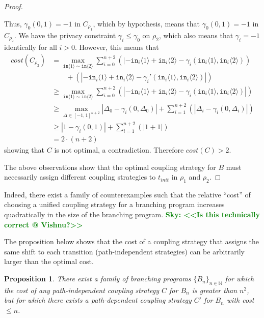 \documentclass[12pt]{article}
\newcommand{\NN}{\mathbb{N}}
\newcommand{\brangle}[1]{\langle#1 \rangle}
\newcommand{\todo}[2]{\textcolor{#1}{\textbf{#2}}}
\newcommand{\sky}[1]{\todo{green}{Sky: <<#1>>}}
\newtheorem{prop}[thm]{Proposition}
\theoremstyle{definition}
\begin{document}
\begin{proof}
\begin{itemize}
    Thus, $\gamma_0(0, 1) = -1$ in $C_{\rho_1}$, which by hypothesis, means that $\gamma_0(0, 1) = -1$ in $C_{\rho_2}$. We have the privacy constraint $\gamma_i \leq \gamma_0$ on $\rho_2$, which also means that $\gamma_i = -1$ identically for all $i > 0$. However, this means that 
    \begin{align*}
        cost(C_{\rho_2}) &= \max_{\texttt{in}\brangle{1}\sim\texttt{in}\brangle{2}}\sum_{i=0}^{n+2}(|-\texttt{in}_i\brangle{1}+\texttt{in}_i\brangle{2}-\gamma_i(\texttt{in}_i\brangle{1}, \texttt{in}_i\brangle{2}))\\&\qquad+(|-\texttt{in}_i\brangle{1}+\texttt{in}_i\brangle{2}-\gamma_i'(\texttt{in}_i\brangle{1}, \texttt{in}_i\brangle{2})|)\\
        &\geq \max_{\texttt{in}\brangle{1}\sim\texttt{in}\brangle{2}} \sum_{i=0}^{n+2}(|-\texttt{in}_i\brangle{1}+\texttt{in}_i\brangle{2}-\gamma_i(\texttt{in}_i\brangle{1}, \texttt{in}_i\brangle{2})|)\\
        &\geq \max_{\Delta \in [-1, 1]^{n+2}} |\Delta_0 - \gamma_i(0, \Delta_0)| + \sum_{i=1}^{n+2}(|\Delta_i-\gamma_i(0, \Delta_i)|)\\
        &\geq |1 - \gamma_i(0, 1)| + \sum_{i=1}^{n+2}(|1+1|)\\
        &= 2 \cdot (n + 2)
    \end{align*}
    showing that $C$ is not optimal, a contradiction. Therefore $cost(C) > 2$.

    \end{itemize}
    
    The above observations show that the optimal coupling strategy for $B$ must necessarily assign different coupling strategies to $t_{init}$ in $\rho_1$ and $\rho_2$.
\end{proof}

Indeed, there exist a family of counterexamples such that the relative ``cost'' of choosing a unified coupling strategy for a branching program increases quadratically in the size of the branching program. \sky{Is this technically correct @ Vishnu?}

The proposition below shows that the cost of a coupling strategy that assigns the same shift to each transition (path-independent strategies) can be arbitrarily larger than the optimal cost. 

\begin{prop}
    There exist a family of branching programs $\{B_n\}_{n\in \NN}$ for which the cost of any path-independent coupling strategy $C$ for $B_n$ is greater than $n^2$, but for which there exists a path-dependent coupling strategy $C'$ for $B_n$ with cost $\leq n$.
\end{prop}
\end{document}
